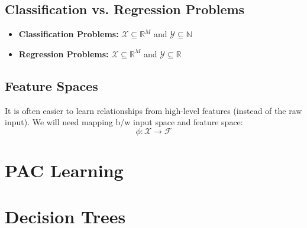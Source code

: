 \documentclass{article}
\begin{document}
\subsection{Classification vs. Regression Problems}
\begin{definition}
    \begin{itemize}
        \item \textbf{Classification Problems:} $\mathcal{X} \subseteq \mathbb{R}^M$ and $\mathcal{Y} \subseteq \mathbb{N}$
        \item \textbf{Regression Problems:} $\mathcal{X} \subseteq \mathbb{R}^M$ and $\mathcal{Y} \subseteq \mathbb{R}$
    \end{itemize}
\end{definition}

\subsection{Feature Spaces}
\begin{definition}
    It is often easier to learn relationships from high-level features (instead of the raw input). We will need mapping b/w input space and feature space:
    $$\phi: \mathcal{X} \rightarrow \mathcal{F}$$
\end{definition}

\section{PAC Learning}


\section{Decision Trees}

\newpage
\end{document}
